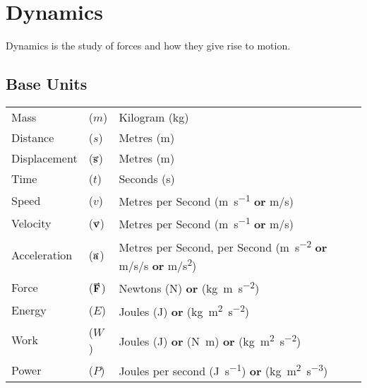 \documentclass[main.tex]{subfiles}
\begin{document}

    \chapter{Dynamics}
        \label{ch: Dynamics}
        \thispagestyle{noheader}

        Dynamics is the study of forces and how they give rise to motion.


        \section{Base Units}
            \label{sec: Base Units Dynamics}

            \begin{table}[!h]
                \noindent\begin{tabular}{@{} p{40mm} C{10mm} p{110mm}}
                    Mass &($m$) &Kilogram (\si{\kilo\gram})\\[\tablegap]
                    Distance &($s$) &Metres (\si{\metre})\\[\tablegap]
                    Displacement &($\vect{s}$) &Metres (\si{\metre})\\[\tablegap]
                    Time &($t$) &Seconds (\si{\second})\\[\tablegap]
                    Speed &($v$) &Metres per Second (\si{\metre \per\second} \textbf{or} \si{\metre / \second})\\[\tablegap]
                    Velocity &($\vect{v}$) &Metres per Second (\si{\metre \per\second} \textbf{or} \si{\metre / \second})\\[\tablegap]
                    Acceleration &($\vect{a}$) &Metres per Second, per Second (\si{\metre \per\second\squared} \textbf{or} \si{\metre /\second /\second} \textbf{or} \si{\metre / \second\squared})\\[\tablegap]
                    Force &($\vect{F}$) &Newtons (\si{\newton}) \textbf{or} (\si{\kilo\gram \metre \per\second\squared})\\[\tablegap]
                    Energy &($E$) &Joules (\si{\joule}) \textbf{or} (\si{\kilo\gram \metre\squared \per\second\squared})\\[\tablegap]
                    Work &($W$) &Joules (\si{\joule}) \textbf{or} (\si{\newton \metre}) \textbf{or} (\si{\kilo\gram \metre\squared \per\second\squared})\\[\tablegap]
                    Power &($P$) &Joules per second (\si{\joule \per\second}) \textbf{or} (\si{\kilo\gram \metre\squared \per\second\cubed})
                \end{tabular}
            \end{table}
\end{document}
